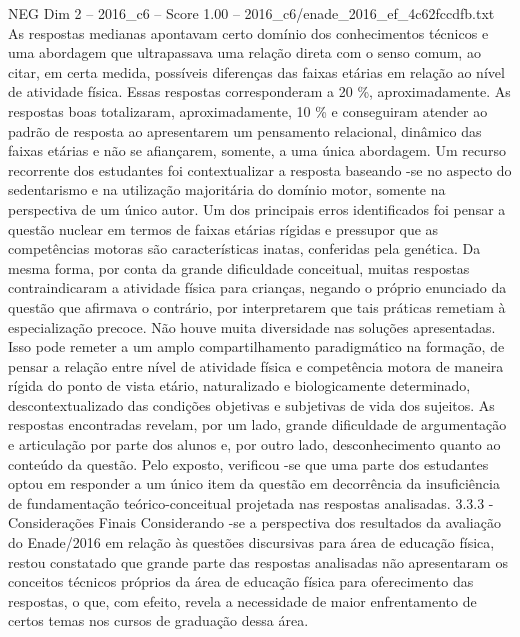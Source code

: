 \begin{textsample}{NEG Dim 2 – 2016\_c6 – Score 1.00 – 2016\_c6/enade\_2016\_ef\_4c62fccdfb.txt}
As respostas medianas apontavam certo domínio dos conhecimentos técnicos e uma abordagem que ultrapassava uma relação direta com o senso comum, ao citar, em certa medida, possíveis diferenças das faixas etárias em relação ao nível de atividade física.
Essas respostas corresponderam a 20 \%, aproximadamente.
As respostas boas totalizaram, aproximadamente, 10 \% e conseguiram atender ao padrão de resposta ao apresentarem um pensamento relacional, dinâmico das faixas etárias e não se afiançarem, somente, a uma única abordagem.
Um recurso recorrente dos estudantes foi contextualizar a resposta baseando -se no aspecto do sedentarismo e na utilização majoritária do domínio motor, somente na perspectiva de um único autor.
Um dos principais erros identificados foi pensar a questão nuclear em termos de faixas etárias rígidas e pressupor que as competências motoras são características inatas, conferidas pela genética.
Da mesma forma, por conta da grande dificuldade conceitual, muitas respostas contraindicaram a atividade física para crianças, negando o próprio enunciado da questão que afirmava o contrário, por interpretarem que tais práticas remetiam à especialização precoce.
Não houve muita diversidade nas soluções apresentadas.
Isso pode remeter a um amplo compartilhamento paradigmático na formação, de pensar a relação entre nível de atividade física e competência motora de maneira rígida do ponto de vista etário, naturalizado e biologicamente determinado, descontextualizado das condições objetivas e subjetivas de vida dos sujeitos.
As respostas encontradas revelam, por um lado, grande dificuldade de argumentação e articulação por parte dos alunos e, por outro lado, desconhecimento quanto ao conteúdo da questão.
Pelo exposto, verificou -se que uma parte dos estudantes optou em responder a um único item da questão em decorrência da insuficiência de fundamentação teórico-conceitual projetada nas respostas analisadas. 3.3.3 - Considerações Finais Considerando -se a perspectiva dos resultados da avaliação do Enade/2016 em relação às questões discursivas para área de educação física, restou constatado que grande parte das respostas analisadas não apresentaram os conceitos técnicos próprios da área de educação física para oferecimento das respostas, o que, com efeito, revela a necessidade de maior enfrentamento de certos temas nos cursos de graduação dessa área.

\end{textsample}
